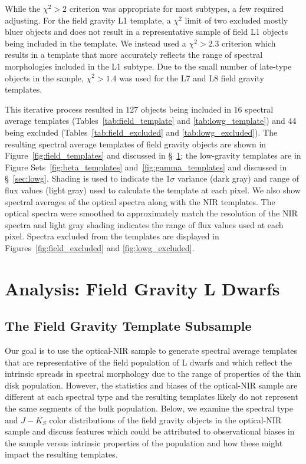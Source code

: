 \documentclass[12pt,preprint]{aastex}
\begin{document}
While the $\chi^2 > 2$ criterion was appropriate for most subtypes, a few required adjusting.
For the field gravity L1 template, a $\chi^2$ limit of two excluded mostly bluer objects and does not result in a representative sample of field L1 objects being included in the template.
We instead used a $\chi^2 > 2.3$ criterion which results in a template that more accurately reflects the range of spectral morphologies included in the L1 subtype.
Due to the small number of late-type objects in the sample, $\chi^2 > 1.4$ was used for the L7 and L8 field gravity templates.

This iterative process resulted in 127 objects being included in 16 spectral average templates (Tables~\ref{tab:field_template} and \ref{tab:lowg_template}) and 44 being excluded (Tables~\ref{tab:field_excluded} and \ref{tab:lowg_excluded}).
The resulting spectral average templates of field gravity objects are shown in Figure~\ref{fig:field_templates} and discussed in \S~\ref{sec:fieldg}; the low-gravity templates are in Figure Sets~\ref{fig:beta_templates} and~\ref{fig:gamma_templates} and discussed in \S~\ref{sec:lowg}. 
Shading is used to indicate the 1$\sigma$ variance (dark gray) and range of flux values (light gray) used to calculate the template at each pixel.
We also show spectral averages of the optical spectra along with the NIR templates. The optical spectra were smoothed to approximately match the resolution of the NIR spectra and light gray shading indicates the range of flux values used at each pixel.
Spectra excluded from the templates are displayed in Figures~\ref{fig:field_excluded} and \ref{fig:lowg_excluded}.

\clearpage
\section{Analysis: Field Gravity L Dwarfs}
\label{sec:fieldg}

\subsection{The Field Gravity Template Subsample}
\label{sec:templates_normal}

Our goal is to use the optical-NIR sample to generate spectral average templates that are representative of the field population of L dwarfs and which reflect the intrinsic spreads in spectral morphology due to the range of properties of the thin disk population.
However, the statistics and biases of the optical-NIR sample are different at each spectral type and the resulting templates likely do not represent the same segments of the bulk population. 
Below, we examine the spectral type and $J-K_S$ color distributions of the field gravity objects in the optical-NIR sample and discuss features which could be attributed to observational biases in the sample versus intrinsic properties of the population and how these might impact the resulting templates.
\end{document}
